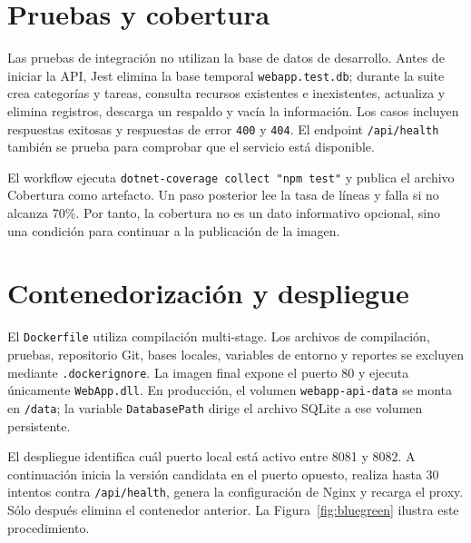 \documentclass[12pt,a4paper]{report}
\begin{document}
\section{Pruebas y cobertura}

Las pruebas de integración no utilizan la base de datos de desarrollo. Antes de iniciar la API, Jest elimina la base temporal \texttt{webapp.test.db}; durante la suite crea categorías y tareas, consulta recursos existentes e inexistentes, actualiza y elimina registros, descarga un respaldo y vacía la información. Los casos incluyen respuestas exitosas y respuestas de error \texttt{400} y \texttt{404}. El endpoint \texttt{/api/health} también se prueba para comprobar que el servicio está disponible.

El workflow ejecuta \texttt{dotnet-coverage collect "npm test"} y publica el archivo Cobertura como artefacto. Un paso posterior lee la tasa de líneas y falla si no alcanza 70\%. Por tanto, la cobertura no es un dato informativo opcional, sino una condición para continuar a la publicación de la imagen.

\section{Contenedorización y despliegue}

El \texttt{Dockerfile} utiliza compilación multi-stage. Los archivos de compilación, pruebas, repositorio Git, bases locales, variables de entorno y reportes se excluyen mediante \texttt{.dockerignore}. La imagen final expone el puerto 80 y ejecuta únicamente \texttt{WebApp.dll}. En producción, el volumen \texttt{webapp-api-data} se monta en \texttt{/data}; la variable \texttt{DatabasePath} dirige el archivo SQLite a ese volumen persistente.

El despliegue identifica cuál puerto local está activo entre 8081 y 8082. A continuación inicia la versión candidata en el puerto opuesto, realiza hasta 30 intentos contra \texttt{/api/health}, genera la configuración de Nginx y recarga el proxy. Sólo después elimina el contenedor anterior. La Figura~\ref{fig:bluegreen} ilustra este procedimiento.
\end{document}
